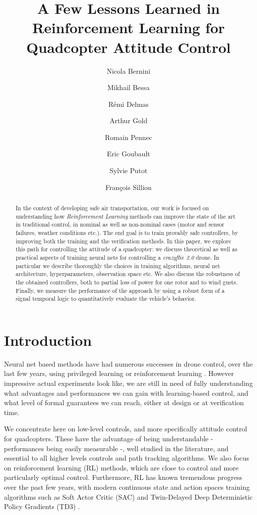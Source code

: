 \documentclass[anonymous=true,format=sigconf, screen=true, review=false]{acmart}
\title{A Few Lessons Learned in Reinforcement Learning for Quadcopter Attitude Control}
\author{Nicola Bernini}
\affiliation{
\institution{ATCP, Uber Elevate}
\streetaddress{5 rue Charlot}
\city{Paris}
\postcode{75003}
\country{France}
}
\author{Mikhail Bessa}
\affiliation{
\institution{?}
\streetaddress{?}
\city{Paris}
\postcode{?}
\country{France}
}
\author{Rémi Delmas}
\affiliation{
\institution{ATCP, Uber Elevate}
\streetaddress{5 rue Charlot}
\city{Paris}
\postcode{75003}
\country{France}
}
\author{Arthur Gold}
\affiliation{
\institution{ATCP, Uber Elevate}
\streetaddress{5 rue Charlot}
\city{Paris}
\postcode{75003}
\country{France}
}
\author{Romain Pennec}
\affiliation{
\institution{ATCP, Uber Elevate}
\streetaddress{5 rue Charlot}
\city{Paris}
\postcode{75003}
\country{France}
}
\author{Eric Goubault}
\affiliation{
\institution{LIX, Ecole polytechnique, CNRS, IP-Paris}
\city{Palaiseau}
\postcode{91128}
\country{France}
}
\author{Sylvie Putot}
\affiliation{
\institution{LIX, Ecole polytechnique, CNRS, IP-Paris}
\city{Palaiseau}
\postcode{91128}
\country{France}
}
\author{François Sillion}
\affiliation{
\institution{ATCP, Uber Elevate}
\streetaddress{5 rue Charlot}
\city{Paris}
\postcode{75003}
\country{France}
}
\begin{document}



\begin{abstract}
In the context of developing safe air transportation, our work is focused on understanding how {\it Reinforcement Learning} methods can improve the state of the art in traditional control, in nominal as well as non-nominal cases (motor and sensor failures, weather conditions etc.). The end goal is to train provably safe controllers, by improving both the training and the verification methods. In this paper, we explore this path for controlling the attitude of a quadcopter: we discuss theoretical as well as practical aspects of training neural nets for controlling a {\it crazyflie 2.0} drone. In particular we describe thoroughly the choices in training algorithms, neural net architecture, hyperparameters, observation space etc. We also discuss the robustness of the obtained controllers, both to partial loss of power for one rotor and to wind gusts. Finally, we measure the performance of the approach by using a robust form of a signal temporal logic to quantitatively evaluate the vehicle's behavior. %
\end{abstract}

\maketitle


\section{Introduction}

Neural net based methods have had numerous successes in drone control, over the last few years, using privileged learning \cite{deepdroneacrobatics} or reinforcement learning \cite{RLquadcontrol}. However impressive actual experiments look like, we are still in need of fully understanding what advantages and performances we can gain with learning-based control, and what level of formal guarantees we can reach, either at design or at verification time.

We concentrate here on low-level controls, and more specifically attitude control for  quadcopters. These have the advantage of being understandable - performances being easily measurable -, well studied in the literature, and essential to all higher levels controls and path tracking algorithms. We also focus on reinforcement learning (RL) methods, which are close to control and more particularly optimal control. Furthermore,  RL has known tremendous progress over the past few years, with modern continuous state and action spaces training algorithms such as Soft Actor Critic (SAC) \cite{SAC} and Twin-Delayed Deep Deterministic Policy Gradients (TD3) \cite{TD3}. 
\end{document}
